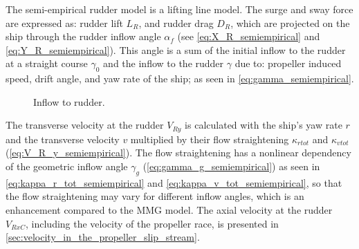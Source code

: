 The semi-empirical rudder model is a lifting line model. The surge and sway force are expressed as: rudder lift $L_R$, and rudder drag $D_R$, which are projected on the ship through the rudder inflow angle $\alpha_f$ (see \autoref{eq:X_R_semiempirical} and \autoref{eq:Y_R_semiempirical}).
This angle is a sum of the initial inflow to the rudder at a straight course $\gamma_0$ and the inflow to the rudder $\gamma$ due to: propeller induced speed, drift angle, and yaw rate of the ship; as seen in \autoref{eq:gamma_semiempirical}.
%
\begin{figure}[h]
    \centering
    
    \caption{Inflow to rudder.}
    \label{fig:reference_frames}
\end{figure}
%
\begin{equation}
    \label{eq:X_R_semiempirical}
    
\end{equation}
%
\begin{equation}
    \label{eq:Y_R_semiempirical}
    
\end{equation}
%
\begin{equation}
    \label{eq:alpha_f_semiempirical}
    
\end{equation}
%
\begin{equation}
    \label{eq:gamma_semiempirical}
    
\end{equation}
The transverse velocity at the rudder $V_{Ry}$ is calculated with the ship's yaw rate $r$ and the transverse velocity $v$ multiplied by their flow straightening $\kappa_{rtot}$ and $\kappa_{vtot}$ (\autoref{eq:V_R_y_semiempirical}). The flow straightening has a nonlinear dependency of the geometric inflow angle $\gamma_g$ (\autoref{eq:gamma_g_semiempirical}) as seen in \autoref{eq:kappa_r_tot_semiempirical} and \autoref{eq:kappa_v_tot_semiempirical}, so that the flow straightening may vary for different inflow angles, which is an enhancement compared to the MMG model.
The axial velocity at the rudder $V_{RxC}$, including the velocity of the propeller race, is presented in \autoref{sec:velocity_in_the_propeller_slip_stream}.
\begin{equation}
    \label{eq:V_R_y_semiempirical}
    
\end{equation}
%
\begin{equation}
    \label{eq:kappa_r_tot_semiempirical}
    
\end{equation}
